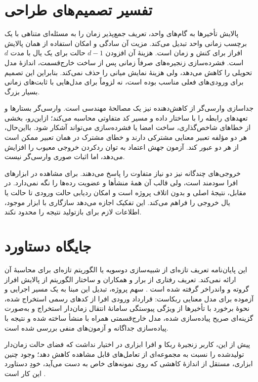 \section{تفسیر تصمیم‌های طراحی}

پالایش تأخیرها به گام‌های واحد، تعریف جمع‌پذیر زمان را به مسئله‌ای متناهی با یک برچسب زمانی واحد تبدیل می‌کند. مزیت آن سادگی و امکان استفاده از همان پالایش افراز برای کنش و زمان است. هزینهٔ آن افزودن $d-1$ حالت برای یک یال با مدت $d$ است. فشرده‌سازی زنجیره‌های صرفاً زمانی پس از ساخت خارج‌قسمت، اندازهٔ مدل تحویلی را کاهش می‌دهد، ولی هزینهٔ نمایش میانی را حذف نمی‌کند. بنابراین این تصمیم برای ورودی‌های فعلی مناسب بوده است، نه لزوماً برای مدل‌هایی با ثابت‌های زمانی بسیار بزرگ.

جداسازی وارسی‌گر از کاهش‌دهنده نیز یک مصالحهٔ مهندسی است. وارسی‌گر بستارها و تعهدهای رابطه را با ساختار داده و مسیر کد متفاوتی محاسبه می‌کند؛ ازاین‌رو، بخشی از خطاهای شاخص‌گذاری، ساخت امضا یا فشرده‌سازی می‌تواند آشکار شود. بااین‌حال، هر دو مؤلفه تعبیر معنایی مشترکی دارند و خطای مشترک در همان تعبیر ممکن است از هر دو عبور کند. آزمون جهش اعتماد به توان ردکردن خروجی معیوب را افزایش می‌دهد، اما اثبات صوری وارسی‌گر نیست.

خروجی‌های چندگانه نیز دو نیاز متفاوت را پاسخ می‌دهند.  برای مشاهده در ابزارهای افرا سودمند است، ولی قالب آن همهٔ منشأها و عضویت رده‌ها را نگه نمی‌دارد. در مقابل،  نتیجهٔ اصلی و بدون اتلاف پروژه است و  امکان ردیابی حالت ورودی تا حالت یا یال خروجی را فراهم می‌کند. این تفکیک اجازه می‌دهد سازگاری با ابزار موجود، اطلاعات لازم برای بازتولید نتیجه را محدود نکند.

\section{جایگاه دستاورد}

این پایان‌نامه تعریف تازه‌ای از شبیه‌سازی دوسویه یا الگوریتم تازه‌ای برای محاسبهٔ آن ارائه نمی‌کند. تعریف رفتاری از برار و همکاران و ساختار الگوریتم از پالایش افراز گروته و واندراخر گرفته شده است \cite{BerardEtAl2008,GrooteVaandrager1990}. سهم پروژه، تبدیل این مبنا به یک مسیر اجرایی و آزموده برای مدل معنایی ربکاست: قرارداد ورودی افرا از کدهای رسمی استخراج شده، نحوهٔ برخورد با تأخیرها از ویژگی پیوستگی سامانهٔ انتقال زمان‌دار استخراج و به‌صورت گزینه‌ای صریح پیاده‌سازی شده، مدل خارج‌قسمتی همراه با منشأ ساخته شده و نتیجه با پیاده‌سازی جداگانه و آزمون‌های منفی بررسی شده است.

پیش از این، کاربر زنجیرهٔ ربکا و افرا ابزاری در اختیار نداشت که فضای حالت زمان‌دار تولیدشده را نسبت به مجموعه‌ای از تعامل‌های قابل مشاهده کاهش دهد؛ وجود چنین ابزاری، مستقل از اندازهٔ کاهشی که روی نمونه‌های خاص به دست می‌آید، خودِ دستاورد این کار است \cite{AfraWebsite2026,RMCGitHub2026,AfraWeakTimedReduction2026}.

